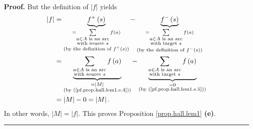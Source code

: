 \documentclass[numbers=enddot,12pt,final,onecolumn,notitlepage]{scrartcl}%
\theoremstyle{definition}
\newenvironment{proof}[1][Proof]{\noindent\textbf{#1.} }{\ \rule{0.5em}{0.5em}}
\let\sumnonlimits\sum
\renewcommand{\sum}{\sumnonlimits\limits}
\begin{document}
\begin{proof}
But the definition of $\left\vert f\right\vert $ yields%
\begin{align*}
\left\vert f\right\vert  &  =\underbrace{f^{+}\left(  s\right)  }%
_{\substack{=\sum_{\substack{a\in A\text{ is an arc}\\\text{with source }%
s}}f\left(  a\right)  \\\text{(by the definition of }f^{+}\left(  s\right)
\text{)}}}-\underbrace{f^{-}\left(  s\right)  }_{\substack{=\sum
_{\substack{a\in A\text{ is an arc}\\\text{with target }s}}f\left(  a\right)
\\\text{(by the definition of }f^{-}\left(  s\right)  \text{)}}}\\
&  =\underbrace{\sum_{\substack{a\in A\text{ is an arc}\\\text{with source }%
s}}f\left(  a\right)  }_{\substack{=\left\vert M\right\vert \\\text{(by
(\ref{pf.prop.hall.lem1.e.4}))}}}-\underbrace{\sum_{\substack{a\in A\text{ is
an arc}\\\text{with target }s}}f\left(  a\right)  }_{\substack{=0\\\text{(by
(\ref{pf.prop.hall.lem1.e.5}))}}}\\
&  =\left\vert M\right\vert -0=\left\vert M\right\vert .
\end{align*}
In other words, $\left\vert M\right\vert =\left\vert f\right\vert $. This
proves Proposition \ref{prop.hall.lem1} \textbf{(e)}.
\end{proof}
\end{document}
